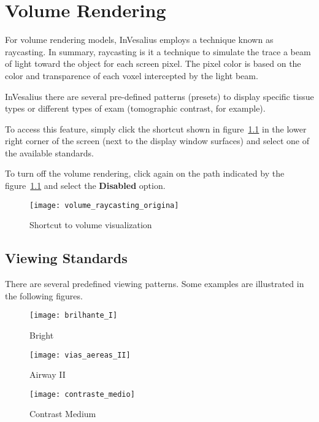 \chapter{Volume Rendering}
\label{cap:vis_vol}

For volume rendering models, InVesalius employs a technique known as raycasting. In summary, raycasting is it a technique to simulate the trace a beam of light toward the object for each screen pixel. The pixel color is based on the color and transparence of each voxel intercepted by the light beam.

InVesalius there are several pre-defined patterns (presets) to display specific tissue types or different types of exam (tomographic contrast, for example).

To access this feature, simply click the shortcut shown in figure~\ref{fig:volume_raycasting_origina} in the lower right corner of the screen (next to the display window surfaces) and select one of the available standards.

To turn off the volume rendering, click again on the path indicated by the figure~\ref{fig:volume_raycasting_origina} and select the \textbf{Disabled} option.

\begin{figure}[!htb]
\centering
\texttt{[image: volume\_raycasting\_origina]}
\caption{Shortcut to volume visualization}
\label{fig:volume_raycasting_origina}
\end{figure}

\section{Viewing Standards}

There are several predefined viewing patterns. Some examples are illustrated in the following figures. 

\begin{figure}[!htb]
\centering
\texttt{[image: brilhante\_I]}
\caption{Bright}
\label{fig:brilhante_I}
\end{figure}

\begin{figure}[!htb]
\centering 
\texttt{[image: vias\_aereas\_II]}
\caption{Airway II}
\label{fig:vias_aereas_II} 
\end{figure}

\begin{figure}[!htb]
\centering
\texttt{[image: contraste\_medio]}
\caption{Contrast Medium}
\label{fig:contraste_medio}
\end{figure}

